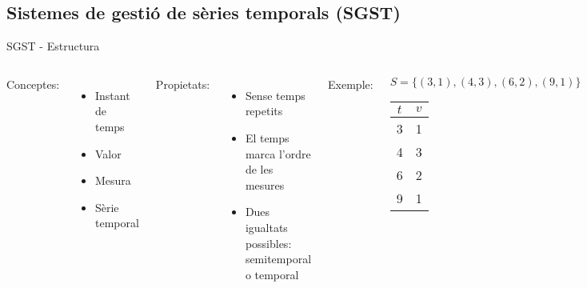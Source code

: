 \subsection[SGST]{Sistemes de gestió de sèries temporals (SGST)}




\begin{frame}{SGST - Estructura}
\begin{columns}

  \column{5cm}

  Conceptes:
  \begin{itemize}

  \item Instant de temps
  \item Valor
  \item Mesura
  \item Sèrie temporal

  \end{itemize}

  Propietats:
  \begin{itemize}

  \item Sense temps repetits
  \item El temps marca l'ordre de les mesures
  \item Dues igualtats possibles: semitemporal o temporal

  \end{itemize} 

  
  \column{5.1cm}
  Exemple:
  \begin{center}
    $S=\{(3,1), (4,3), (6,2), (9,1)\}$\\[1em]

    \begin{tabular}[h]{|c|c|}\hline
      $t$ & $v$ \\\hline
      3 & 1 \\
      4 & 3 \\
      6 & 2 \\
      9 & 1 \\\hline
    \end{tabular}

  \end{center}

\end{columns}
\end{frame}




